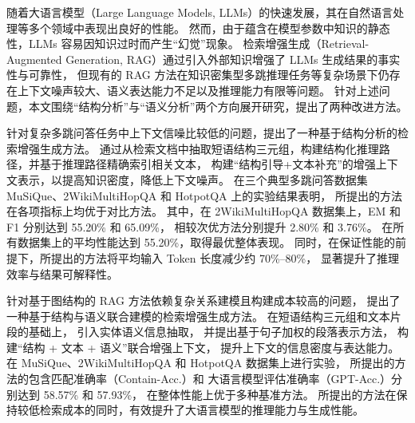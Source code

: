 \begin{cabstract}

  随着大语言模型（Large Language Models, LLMs）的快速发展，其在自然语言处理等多个领域中表现出良好的性能。
  然而，由于蕴含在模型参数中知识的静态性，LLMs 容易因知识过时而产生“幻觉”现象。
  检索增强生成（Retrieval-Augmented Generation, RAG）通过引入外部知识增强了 LLMs 生成结果的事实性与可靠性，
  但现有的 RAG 方法在知识密集型多跳推理任务等复杂场景下仍存在上下文噪声较大、语义表达能力不足以及推理能力有限等问题。
  针对上述问题，本文围绕“结构分析”与“语义分析”两个方向展开研究，提出了两种改进方法。

  针对复杂多跳问答任务中上下文信噪比较低的问题，提出了一种基于结构分析的检索增强生成方法。
  通过从检索文档中抽取短语结构三元组，构建结构化推理路径，并基于推理路径精确索引相关文本，
  构建“结构引导+文本补充”的增强上下文表示，以提高知识密度，降低上下文噪声。
  在三个典型多跳问答数据集 MuSiQue、2WikiMultiHopQA 和 HotpotQA 上的实验结果表明，
  所提出的方法在各项指标上均优于对比方法。
  其中，在 2WikiMultiHopQA 数据集上，EM 和 F1 分别达到 55.20\% 和 65.09\%，
  相较次优方法分别提升 2.80\% 和 3.76\%。
  在所有数据集上的平均性能达到 55.20\%，取得最优整体表现。
  同时，在保证性能的前提下，所提出的方法将平均输入 Token 长度减少约 70\%--80\%，
  显著提升了推理效率与结果可解释性。

  针对基于图结构的 RAG 方法依赖复杂关系建模且构建成本较高的问题，
  提出了一种基于结构与语义联合建模的检索增强生成方法。
  在短语结构三元组和文本片段的基础上，
  引入实体语义信息抽取，
  并提出基于句子加权的段落表示方法，
  构建“结构 + 文本 + 语义”联合增强上下文，
  提升上下文的信息密度与表达能力。
  在 MuSiQue、2WikiMultiHopQA 和 HotpotQA 数据集上进行实验，
  所提出的方法的包含匹配准确率（Contain-Acc.）和
  大语言模型评估准确率（GPT-Acc.）分别达到 58.57\% 和 57.93\%，
  在整体性能上优于多种基准方法。
  所提出的方法在保持较低检索成本的同时，有效提升了大语言模型的推理能力与生成性能。

\end{cabstract}

